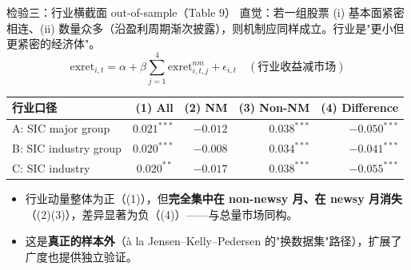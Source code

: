 \documentclass[aspectratio=169,10pt]{beamer}
\newcommand{\tighttable}{\scriptsize\setlength{\tabcolsep}{3pt}\renewcommand{\arraystretch}{1.12}}
\begin{document}
\begin{frame}{检验三：行业横截面 out-of-sample（Table 9）}
	直觉：若一组股票 (i) 基本面紧密相连、(ii) 数量众多（沿盈利周期渐次披露），则机制应同样成立。行业是"更小但更紧密的经济体"。
	\[
	\mathrm{exret}_{i,t}=\alpha+\beta\sum_{j=1}^{4}\mathrm{exret}^{nm}_{i,t,j}+\epsilon_{i,t}\quad(\text{行业收益减市场})
	\]
	\tighttable
	\begin{tabular}{lrrrr}
		\toprule
		行业口径 & (1) All & (2) NM & (3) Non-NM & (4) Difference \\
		\midrule
		A: SIC major group & $0.021^{***}$ & $-0.012$ & $0.038^{***}$ & $-0.050^{***}$ \\
		B: SIC industry group & $0.020^{***}$ & $-0.008$ & $0.034^{***}$ & $-0.041^{***}$ \\
		C: SIC industry & $0.020^{**}$ & $-0.017$ & $0.038^{***}$ & $-0.055^{***}$ \\
		\bottomrule
	\end{tabular}
	\vspace{3pt}
	\begin{itemize}
		\item 行业动量整体为正（(1)），但\textbf{完全集中在 non-newsy 月、在 newsy 月消失}（(2)(3)），差异显著为负（(4)）——与总量市场同构。
		\item 这是\textbf{真正的样本外}（à la Jensen--Kelly--Pedersen 的"换数据集"路径），扩展了广度也提供独立验证。
	\end{itemize}
\end{frame}
\end{document}
